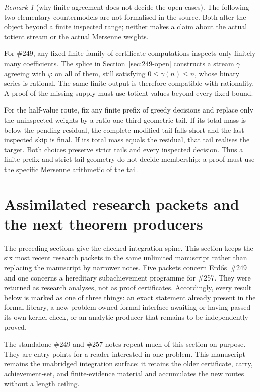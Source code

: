 \documentclass[11pt]{article}
\theoremstyle{definition}
\theoremstyle{remark}
\newtheorem*{remark}{Remark}
\newcommand{\ph}{\varphi}
\begin{document}
\begin{remark}[why finite agreement does not decide the open cases]
The following two elementary countermodels are not formalised in the source.
Both alter the object beyond a finite inspected range; neither makes a claim
about the actual totient stream or the actual Mersenne weights.

For \#249, any fixed finite family of certificate computations inspects only
finitely many coefficients.  The splice in Section~\ref{sec:249-open}
constructs a stream \(\gamma\) agreeing with \(\ph\) on all of them, still
satisfying \(0\leq\gamma(n)\leq n\), whose binary series is rational.  The
same finite output is therefore compatible with rationality.  A proof of the
missing supply must use totient values beyond every fixed bound.

For the half-value route, fix any finite prefix of greedy decisions and
replace only the uninspected weights by a ratio-one-third geometric tail.
If its total mass is below the pending residual, the complete modified tail
falls short and the last inspected skip is final.  If its total mass equals
the residual, that tail realises the target.  Both choices preserve strict
tails and every inspected decision.  Thus a finite prefix and strict-tail
geometry do not decide membership; a proof must use the specific Mersenne
arithmetic of the tail.
\end{remark}

\section{Assimilated research packets and the next theorem producers}
\label{sec:assimilated-packets}

The preceding sections give the checked integration spine.  This section keeps
the six most recent research packets in the same unlimited manuscript rather
than replacing the manuscript by narrower notes.  Five packets concern
Erd\H{o}s~\#249 and one concerns a hereditary subachievement programme for
\#257.  They were returned as research analyses, not as proof certificates.
Accordingly, every result below is marked as one of three things: an exact
statement already present in the formal library, a new problem-owned formal
interface awaiting or having passed its own kernel check, or an analytic
producer that remains to be independently proved.

The standalone \#249 and \#257 notes repeat much of this section on purpose.
They are entry points for a reader interested in one problem.  This manuscript
remains the unabridged integration surface: it retains the older certificate,
carry, achievement-set, and finite-evidence material and accumulates the new
routes without a length ceiling.
\end{document}
